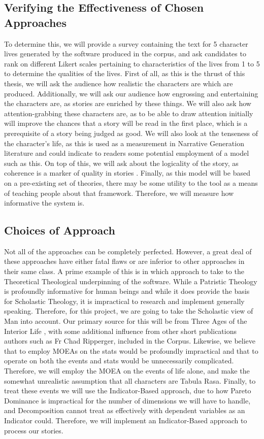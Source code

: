\documentclass[11pt]{article}
\begin{document}
\subsection{Verifying the Effectiveness of Chosen Approaches}
To determine this, we will provide a survey containing the text for 5 character lives generated by the software produced in the corpus, and ask candidates to rank on different Likert scales pertaining to characteristics of the lives from 1 to 5 to determine the qualities of the lives. First of all, as this is the thrust of this thesis, we will ask the audience how realistic the characters are which are produced. Additionally, we will ask our audience how engrossing and entertaining the characters are, as stories are enriched by these things. We will also ask how attention-grabbing these characters are, as to be able to draw attention initially will improve the chances that a story will be read in the first place, which is a prerequisite of a story being judged as good. We will also look at the tenseness of the character's life, as this is used as a measurement in Narrative Generation literature and could indicate to readers some potential employment of a model such as this\cite{questgeneration}. On top of this, we will ask about the logicality of the story, as coherence is a marker of quality in stories \cite{sagarkar-etal-2018-quality}. Finally, as this model will be based on a pre-existing set of theories, there may be some utility to the tool as a means of teaching people about that framework. Therefore, we will measure how informative the system is.\\
\subsection{Choices of Approach}
Not all of the approaches can be completely perfected. However, a great deal of these approaches have either fatal flaws or are inferior to other approaches in their same class. A prime example of this is in which approach to take to the Theoretical Theological underpinning of the software. While a Patristic Theology is profoundly informative for human beings and while it does provide the basis for Scholastic Theology, it is impractical to research and implement generally speaking. Therefore, for this project, we are going to take the Scholastic view of Man into account. Our primary source for this will be from Three Ages of the Interior Life \cite{garrigou2013three}, with some additional influence from other short publications authors such as Fr Chad Ripperger, included in the Corpus. Likewise, we believe that to employ MOEAs on the stats would be profoundly impractical and that to operate on both the events and stats would be unnecessarily complicated. Therefore, we will employ the MOEA on the events of life alone, and make the somewhat unrealistic assumption that all characters are Tabula Rasa. Finally, to treat these events we will use the Indicator-Based approach, due to how Pareto Dominance is impractical for the number of dimensions we will have to handle, and Decomposition cannot treat as effectively with dependent variables as an Indicator could. Therefore, we will implement an Indicator-Based approach to process our stories.\\
\end{document}
